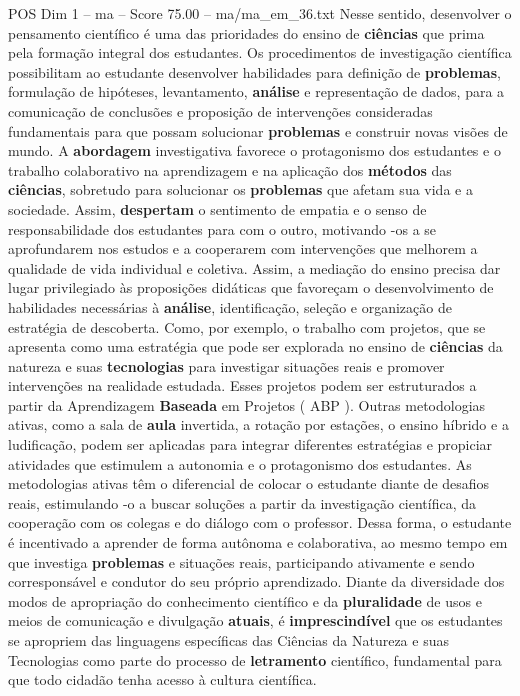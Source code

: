 \begin{textsample}{POS Dim 1 – ma – Score 75.00 – ma/ma\_em\_36.txt}
Nesse sentido, desenvolver o pensamento científico é uma das prioridades do ensino de \textbf{ciências} que prima pela formação integral dos estudantes.
Os procedimentos de investigação científica possibilitam ao estudante desenvolver habilidades para definição de \textbf{problemas}, formulação de hipóteses, levantamento, \textbf{análise} e representação de dados, para a comunicação de conclusões e proposição de intervenções consideradas fundamentais para que possam solucionar \textbf{problemas} e construir novas visões de mundo.
A \textbf{abordagem} investigativa favorece o protagonismo dos estudantes e o trabalho colaborativo na aprendizagem e na aplicação dos \textbf{métodos} das \textbf{ciências}, sobretudo para solucionar os \textbf{problemas} que afetam sua vida e a sociedade.
Assim, \textbf{despertam} o sentimento de empatia e o senso de responsabilidade dos estudantes para com o outro, motivando -os a se aprofundarem nos estudos e a cooperarem com intervenções que melhorem a qualidade de vida individual e coletiva.
Assim, a mediação do ensino precisa dar lugar privilegiado às proposições didáticas que favoreçam o desenvolvimento de habilidades necessárias à \textbf{análise}, identificação, seleção e organização de estratégia de descoberta.
Como, por exemplo, o trabalho com projetos, que se apresenta como uma estratégia que pode ser explorada no ensino de \textbf{ciências} da natureza e suas \textbf{tecnologias} para investigar situações reais e promover intervenções na realidade estudada.
Esses projetos podem ser estruturados a partir da Aprendizagem \textbf{Baseada} em Projetos ( ABP ).
Outras metodologias ativas, como a sala de \textbf{aula} invertida, a rotação por estações, o ensino híbrido e a ludificação, podem ser aplicadas para integrar diferentes estratégias e propiciar atividades que estimulem a autonomia e o protagonismo dos estudantes.
As metodologias ativas têm o diferencial de colocar o estudante diante de desafios reais, estimulando -o a buscar soluções a partir da investigação científica, da cooperação com os colegas e do diálogo com o professor.
Dessa forma, o estudante é incentivado a aprender de forma autônoma e colaborativa, ao mesmo tempo em que investiga \textbf{problemas} e situações reais, participando ativamente e sendo corresponsável e condutor do seu próprio aprendizado.
Diante da diversidade dos modos de apropriação do conhecimento científico e da \textbf{pluralidade} de usos e meios de comunicação e divulgação \textbf{atuais}, é \textbf{imprescindível} que os estudantes se apropriem das linguagens específicas das Ciências da Natureza e suas Tecnologias como parte do processo de \textbf{letramento} científico, fundamental para que todo cidadão tenha acesso à cultura científica.

\end{textsample}
